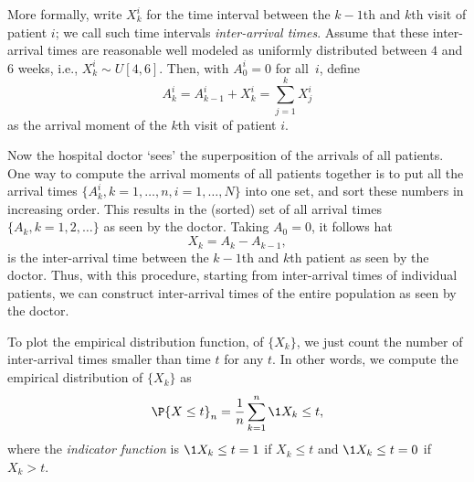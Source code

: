 More formally, write $X_k^i$ for the time interval between the $k-1$th and $k$th visit of patient $i$; we call such time intervals \emph{inter-arrival times}.
Assume that these inter-arrival times are reasonable well modeled as uniformly distributed between $4$ and $6$ weeks, i.e., $X_k^i \sim U[4, 6]$.
Then, with $A_{0}^i=0$ for all~$i$, define
\begin{equation}\label{eq:A_kk}
A_k^i = A_{k-1}^i + X_k^i = \sum_{j=1}^k X_j^i
\end{equation}
as the arrival moment of the $k$th visit of patient $i$.

Now the hospital doctor `sees' the superposition of the arrivals of all patients.
One way to compute the arrival moments of all patients together is to put all the arrival times $\{A_k^i, k=1,\ldots,n, i=1,\ldots,N\}$ into one set, and sort these numbers in increasing order.
This results in the (sorted) set of all arrival times $\{A_k, k=1,2,\ldots\}$ as seen by the doctor.
Taking $A_0=0$, it follows hat
\begin{equation}\label{eq:X_kk}
X_k = A_k - A_{k-1},
\end{equation}
is the inter-arrival time between the $k-1$th and $k$th patient as seen by the doctor.
Thus, with this procedure, starting from inter-arrival times of individual patients, we can construct inter-arrival times of the entire population as seen by the doctor.


To plot the empirical distribution function, of $\{X_k\}$, we just count the number of inter-arrival times smaller than time $t$ for any $t$.
In other words, we compute  the empirical distribution of $\{X_k\}$  as
\begin{equation}\label{eq:3}
  \P{X \leq t}_{n} = \frac1{n}\sum_{k=1}^{n} \1{X_k\leq t},
\end{equation}
where the \emph{indicator function} is $\1{X_k\leq t}=1$ if $X_k\leq t$ and $\1{X_k\leq t}=0$
if $X_k> t$.



